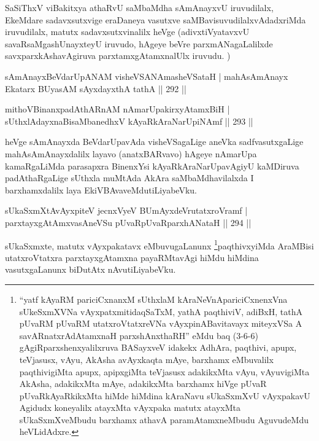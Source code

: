 \begin{artha}
SaSiThxV viBakitxya athaRvU saMbaMdha sAmAnayxvU iruvudilalx, EkeMdare sadavxsutxvige eraDaneya vasutxve saMBavisuvudilalxvAdadxriMda iruvudilalx, matutx sadavxsutxvinalilx heVge (adivxtiVyatavxvU savaRsaMgashUnayxteyU iruvudo, hAgeye beVre parxmANagaLalilxde savxparxkAshavAgiruva parxtamxgAtamxnalUlx iruvudu.	)
\end{artha}


\begin{shl}
sAmAnayxBeVdarUpANAM visheVSANAmasheVSataH |
mahAsAmAnayx Ekatarx BUyasAM sAyxdayxthA tathA \hfill || 292 ||
\end{shl}
\begin{shl}
mithoVBinanxpadAthARnAM nAmarUpakirxyAtamxBiH |
sUthxlAdayxnaBisaMbanedhxV kAyaRkAraNarUpiNAmf \hfill || 293 ||
\end{shl}

\begin{artha}
heVge sAmAnayxda BeVdarUpavAda visheVSagaLige aneVka sadfvasutxgaLige mahAsAmAnayxdalilx layavo (anatxBARvavo) hAgeye nAmarUpa kamaRgaLiMda parasapxra BinenxYsi kAyaRkAraNarUpavAgiyU kaMDiruva padAthaRgaLige sUthxla muMtAda AkAra saMbaMdhavilalxda I barxhamxdalilx laya EkiVBAvaveMdu\break tiLiyabeVku.
\end{artha}


\begin{shl}
sUkaSxmXtAvAyxpiteV jecnxVyeV BUmAyxdeVrutatxroVramf |
parxtayxgAtAmxvasAneVSu pUvaRpUvaRparxhANataH \hfill || 294 ||
\end{shl}

\begin{artha}
sUkaSxmxte, matutx vAyxpakatavx eMbuvugaLanunx \footnote{``yatf kAyaRM pariciCxnanxM sUthxlaM kAraNeVnApariciCxnenxVna sUkeSxmXVNa vAyxpatxmitidaqSaTxM, yathA paqthiviV, adiBxH, tathA pUvaRM pUvaRM utatxroVtatxreVNa vAyxpinABavitavayx miteyxVSa A savARnatxrAdAtamxnaH parxshAnxthaRH'' eMdu baq (3-6-6) gAgiRparxshenxyalilxruva BASayxveV idakekx AdhAra, paqthivi, apupx, teVjasusx, vAyu, AkAsha avAyxkaqta mAye, barxhamx eMbuvalilx paqthivigiMta apupx, apipxgiMta teVjasusx adakikxMta vAyu, vAyuvigiMta AkAsha, adakikxMta mAye, adakikxMta barxhamx hiVge pUvaR pUvaRkAyaRkikxMta hiMde hiMdina kAraNavu sUkaSxmXvU vAyxpakavU Agidudx koneyalilx atayxMta vAyxpaka matutx atayxMta sUkaSxmXveMbudu barxhamx athavA paramAtamxneMbudu AguvudeMdu heVLidAdxre.}paqthivxyiMda AraMBisi utatxroVtatxra parxtayxgAtamxna payaRMtavAgi hiMdu hiMdina vasutxgaLanunx biDutAtx nAvu\break tiLiyabeVku.
\end{artha}


